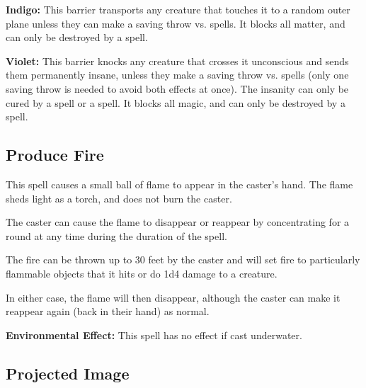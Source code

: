 \begin{multicols*}{2}
\textbf{Indigo:} This barrier transports any creature that touches it to a random outer plane unless they can make a saving throw vs. spells. It blocks all matter, and can only be destroyed by a  spell.

\textbf{Violet:} This barrier knocks any creature that crosses it unconscious and sends them permanently insane, unless they make a saving throw vs. spells (only one saving throw is needed to avoid both effects at once). The insanity can only be cured by a  spell or a  spell. It blocks all magic, and can only be destroyed by a  spell.

\subsection{Produce Fire}\label{spell:Produce Fire}

This spell causes a small ball of flame to appear in the caster’s hand. The flame sheds light as a torch, and does not burn the caster.

The caster can cause the flame to disappear or reappear by concentrating for a round at any time during the duration of the spell.

The fire can be thrown up to 30 feet by the caster and will set fire to particularly flammable objects that it hits or do 1d4 damage to a creature.

In either case, the flame will then disappear, although the caster can make it reappear again (back in their hand) as normal.

\textbf{Environmental Effect:} This spell has no effect if cast underwater.

\subsection{Projected Image}\label{spell:Projected Image}


\end{multicols*}
